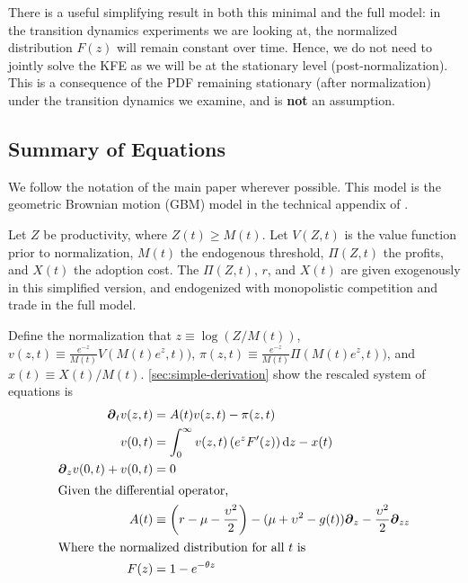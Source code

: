 \documentclass[11pt]{article}
\newcommand{\D}[1][]{\ensuremath{\boldsymbol{\partial}_{#1}}}
\newcommand{\diff}{\ensuremath{\mathrm{d}}}
\begin{document}
There is a useful simplifying result in both this minimal and the full model: in the transition dynamics experiments we are looking at, the normalized distribution $F(z)$ will remain constant over time.  Hence, we do not need to jointly solve the KFE as we will be at the stationary level (post-normalization).  This is a consequence of the PDF remaining stationary (after normalization) under the transition dynamics we examine, and is \textbf{not} an assumption.

\subsection{Summary of Equations}\label{sec:summary-simple}
We follow the notation of the main paper wherever possible.  This model is the geometric Brownian motion (GBM) model in the technical appendix of \cite{BenhabibPerlaTonetti2017}.

Let $Z$ be productivity, where $Z(t) \geq M(t)$.  Let $V(Z,t)$ is the value function prior to normalization, $M(t)$ the endogenous threshold, $\Pi(Z,t)$ the profits, and $X(t)$ the adoption cost.  The $\Pi(Z,t)$, $r$, and $X(t)$ are given exogenously in this simplified version, and endogenized with monopolistic competition and trade in the full model.

Define the normalization that $z \equiv \log(Z/M(t))$, $v(z,t) \equiv \frac{e^{-z}}{M(t)}V(M(t)e^z, t))$, $\pi(z,t) \equiv \frac{e^{-z}}{M(t)}\Pi(M(t)e^z, t))$, and $x(t) \equiv X(t)/M(t)$.  \cref{sec:simple-derivation} show the rescaled system of equations is
\begin{align}
\D[t]v(z,t) &= A(t)v(z,t) - \pi(z,t)\label{eq:simple-summary1}\\
v(0,t) &= \int_{0}^{\infty}  v(z,t) \left(e^z F'(z)\right) \diff z - x(t)\label{eq:simple-summary2}\\
\D[z]v(0,t) + v(0,t) &= 0\label{eq:simple-summary3}\\
\intertext{Given the differential operator,}
A(t) &\equiv \left(r - \mu - \frac{\upsilon^2}{2}\right) - (\mu+ \upsilon^2 - g(t)) \D[z] - \frac{\upsilon^2}{2} \D[zz]\label{eq:simple-summary4}\\
\intertext{Where the normalized distribution for all $t$ is}
F(z) &= 1 - e^{-\theta z}
\end{align}
\end{document}

